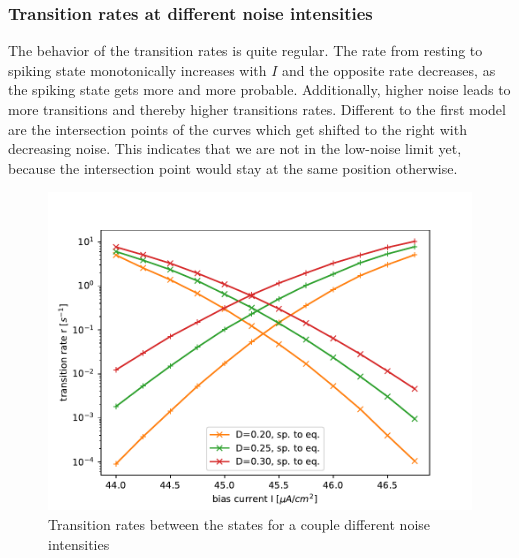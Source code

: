 \documentclass[12pt,a4paper]{article}
\begin{document}
\subsubsection{Transition rates at different noise intensities}
The behavior of the transition rates is quite regular. The rate from resting to spiking state monotonically increases with $I$ and the opposite rate decreases, as the spiking state gets more and more probable. Additionally, higher noise leads to more transitions and thereby higher transitions rates. Different to the first model are the intersection points of the curves which get shifted to the right with decreasing noise. This indicates that we are not in the low-noise limit yet, because the intersection point would stay at the same position otherwise.
\begin{figure}[H]
	\centering
	\includegraphics[scale=1]{tranratesanhopfsp.pdf}\caption{Transition rates between the states for a couple different noise intensities}
	\label{tranrateanhopf}
\end{figure}
\end{document}
